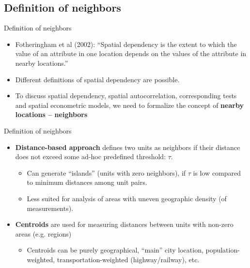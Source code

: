 \documentclass{beamer}
\begin{document}
\subsection{Definition of neighbors}
\begin{frame}{Definition of neighbors}
\begin{itemize}
    \item Fotheringham et al (2002): ``Spatial dependency is the extent to which the value of an attribute in one location depends on the values of the attribute in nearby locations.''
    \medskip
    \item Different definitions of spatial dependency are possible.
    \medskip
    \item To discuss spatial dependency, spatial autocorrelation, corresponding tests and spatial econometric models, we need to formalize the concept of \textbf{nearby locations -- neighbors}
\end{itemize}
\end{frame}
\begin{frame}{Definition of neighbors}
\begin{itemize}
	\item \textbf{Distance-based approach} defines two units as neighbors if their distance does not exceed some ad-hoc predefined threshold: $\tau$. \\
	\medskip
	\begin{itemize}
		\item Can generate ``islands'' (units with zero neighbors), if $\tau$ is low compared to minimum distances among unit pairs.
		\smallskip
		\item Less suited for analysis of areas with uneven geographic density (of measurements). 
	\end{itemize}
	\medskip
	\item \textbf{Centroids} are used for measuring distances between units with non-zero areas (e.g. regions)\\
	\medskip
	\begin{itemize}
		\item Centroids can be purely geographical, ``main'' city location, population-weighted, transportation-weighted (highway/railway), etc.
	\end{itemize}
\end{itemize}
\end{frame}
\end{document}
